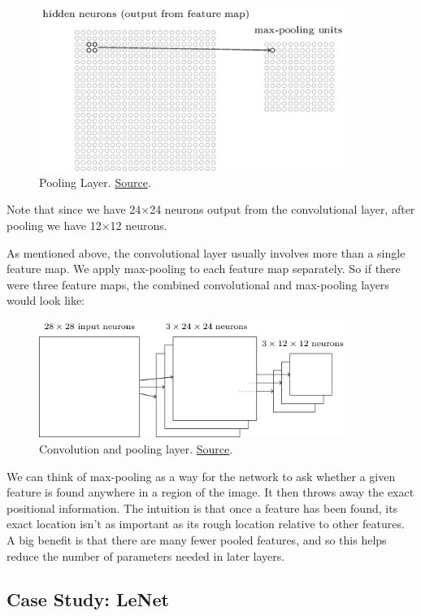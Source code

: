 \documentclass[a4paper]{tufte-handout}
\begin{document}
\begin{figure}
\includegraphics[width=100mm]{max_pooling}
\caption{Pooling Layer.
\href{http://neuralnetworksanddeeplearning.com/chap6.html}{Source}. }
\end{figure}

Note that since we have 24×24 neurons output from the convolutional
layer, after pooling we have 12×12 neurons.

As mentioned above, the convolutional layer usually involves more than a
single feature map. We apply max-pooling to each feature map separately.
So if there were three feature maps, the combined convolutional and
max-pooling layers would look like:

\begin{figure}
\includegraphics[width=100mm]{max_pooling2}
\caption{Convolution and pooling layer.
\href{http://neuralnetworksanddeeplearning.com/chap6.html}{Source}. }
\end{figure}

We can think of max-pooling as a way for the network to ask whether a
given feature is found anywhere in a region of the image. It then throws
away the exact positional information. The intuition is that once a
feature has been found, its exact location isn't as important as its
rough location relative to other features. A big benefit is that there
are many fewer pooled features, and so this helps reduce the number of
parameters needed in later layers.

\subsection{Case Study: LeNet}\label{case-study-lenet}
\end{document}
